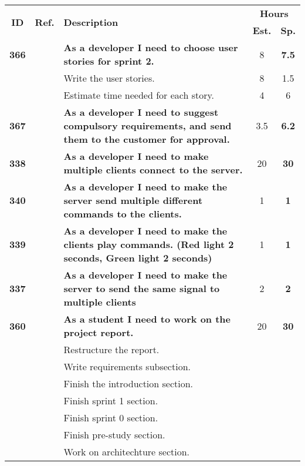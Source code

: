   \label{tab:sprint2stories}
 \def\arraystretch{1.25}
 
\begin{longtable}{ccXcc}
\toprule[1mm]
\multirow{2}{*}{\textbf{ID}} &
\multirow{2}{*}{\textbf{Ref.}} & \multirow{2}{*}{\textbf{Description}} & \multicolumn{2}{c}{\textbf{Hours}} \\
 				& & & \textbf{Est.} & \textbf{Sp.} \\ 				
\midrule
\textbf{366} 	& {M6}
	& {\bf As a developer I need to choose user stories for sprint 2.} 	& 	8	& \textbf{7.5} \\
				&& Write the user stories. 	& 8 &  1.5 \\
				&& Estimate time needed for each story. 	&  4 & 6 \\	

	
\textbf{367} 	& {M6}
	& {\bf As a developer I need to suggest compulsory requirements, and send them to the customer for approval.} 	& 		3.5	& \textbf{6.2} \\

\textbf{338} 	& {M6}
	& {\bf As a developer I need to make multiple clients connect to the server.} 	& 	20		& \textbf{30} \\


\textbf{340} 	& {M6}
	& {\bf As a developer I need to make the server send multiple different commands to the clients. } 	& 		1	& \textbf{1} \\

\textbf{339} 	& {M3}
	& {\bf  As a developer I need to make the clients play commands. (Red light 2 seconds, Green light 2 seconds)} 	& 		1	& \textbf{1} \\

\textbf{337} 	& {M3}
	& {\bf  As a developer I need to make the server to send the same signal to multiple clients} 	& 		2	& \textbf{2} \\
		
\midrule
\textbf{360} 	& {M6}
	& {\bf As a student I need to work on the project report.} 	& 	20	& \textbf{ 30} \\
				&& Restructure the report.	&  &  \\
				&& Write requirements subsection.	&  &  \\
				&& Finish the introduction section.	&  & \\
				&& Finish sprint 1 section.	&  &  \\
				&& Finish sprint 0 section.	&  &  \\
				&& Finish pre-study section.	&  &  \\
				&& Work on architechture section.	&  &  \\


\end{longtable}
